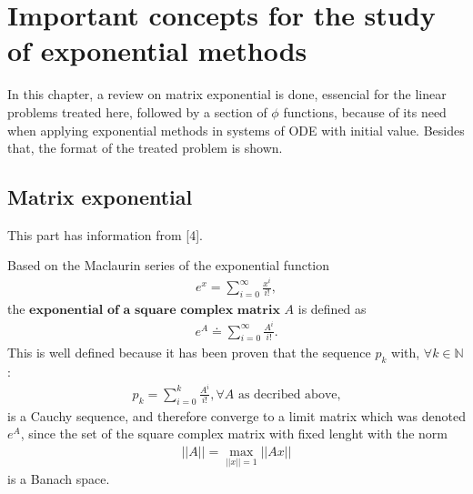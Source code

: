\documentclass[letterpaper,10pt,english]{jupyterBook}
\begin{document}
\sphinxstepscope


\section{Important concepts for the study of exponential methods}
\label{\detokenize{cap3:important-concepts-for-the-study-of-exponential-methods}}\label{\detokenize{cap3::doc}}
\sphinxAtStartPar
In this chapter, a review on matrix exponential is done, essencial for the linear problems treated here, followed by a section of \(\phi\) functions, because of its need when applying exponential methods in systems of ODE with initial value. Besides that, the format of the treated problem is shown.


\subsection{Matrix exponential}
\label{\detokenize{cap3:matrix-exponential}}
\sphinxAtStartPar
This part has information from {[}4{]}.

\sphinxAtStartPar
Based on the Maclaurin series of the exponential function
\begin{equation*}
\begin{split}
    e^x = \sum_{i=0}^{\infty} \frac{x^i}{i!},
\end{split}
\end{equation*}
\sphinxAtStartPar
the \(\textbf{exponential of a square complex matrix }A\) is defined as
\begin{equation*}
\begin{split}
    e^A \doteq \sum_{i=0}^{\infty} \frac{A^i}{i!}.
\end{split}
\end{equation*}
\sphinxAtStartPar
This is well defined because it has been proven that the sequence \({p_k}\) with, \(\forall k \in \mathbb{N}\):
\begin{equation*}
\begin{split}
    p_k = \sum_{i=0}^{k} \frac{A^i}{i!}, \forall A \text{ as decribed above,}
\end{split}
\end{equation*}
\sphinxAtStartPar
is a Cauchy sequence, and therefore converge to a limit matrix which was denoted \(e^A\), since the set of the square complex matrix with fixed lenght with the norm
\begin{equation*}
\begin{split}
||A|| = \max_{||x||=1} ||Ax||
\end{split}
\end{equation*}
\sphinxAtStartPar
is a Banach space.
\end{document}
